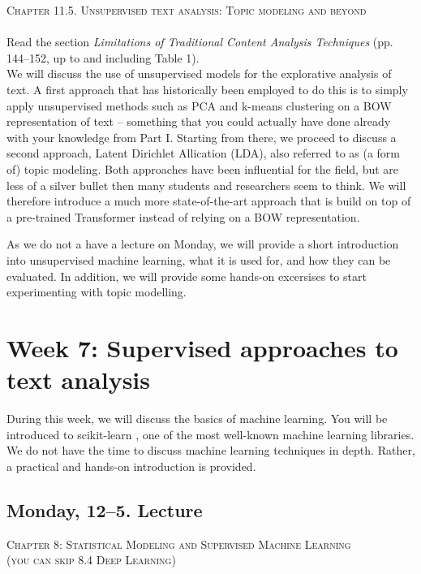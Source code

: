 \textsc{ Chapter 11.5. Unsupervised text analysis: Topic modeling and beyond}\\
\textsc{  \cite{Maier2018a} }  \\
\textsc{ \cite{kroon_advancing_2024}} Read the section \textit{Limitations of Traditional Content Analysis Techniques} (pp. 144–152, up to and including Table 1).  \\


We will discuss the use of unsupervised models for the explorative analysis of text.
A first approach that has historically been employed to do this is to simply apply unsupervised methods such as PCA and k-means clustering on a BOW representation of text -- something that you could actually have done already with your knowledge from Part I. Starting from there, we proceed to discuss a second approach, Latent Dirichlet Allication (LDA), also referred to as (a form of) topic modeling.
Both approaches have been influential for the field, but are less of a silver bullet then many students and researchers seem to think. We will therefore introduce a much more state-of-the-art approach that is build on top of a pre-trained Transformer instead of relying on a BOW representation.

As we do not a have a lecture on Monday, we will provide a short introduction into unsupervised machine learning, what it is used for, and how they can be evaluated. In addition, we will provide some hands-on excersises to start experimenting with topic modelling. 


\section*{Week 7: Supervised approaches to text analysis}

During this week, we will discuss the basics of machine learning. You will be introduced to scikit-learn \citep{scikit-learn}, one of the most well-known machine learning libraries. We do not have the time to discuss machine learning techniques in depth. Rather, a practical and hands-on introduction is provided. 

\subsection*{Monday, 12--5. Lecture}
\textsc{ Chapter 8: Statistical Modeling and Supervised Machine Learning}\\
\textsc{ (you can skip 8.4 Deep Learning)}\\
\textsc{ \cite{Boumans2016}}

